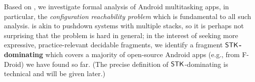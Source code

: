%

Based on {\AMASS}, we %
investigate formal analysis of Android multitasking apps, %
in particular, the \emph{configuration reachability problem} which is fundamental to all such analysis. {\AMASS} is akin to pushdown systems with multiple stacks, so it is perhaps not surprising that the problem is hard in general; 
in the interest of seeking more expressive, practice-relevant decidable fragments,
we identify a fragment \textbf{$\mathsf{STK}$-dominating {\AMASS}} 
which 
covers a majority of open-source Android apps (e.g., from F-Droid) we have found so far. (The precise definition of $\mathsf{STK}$-dominating {\AMASS} is technical and will be given later.) 

